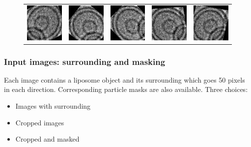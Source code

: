 \documentclass{beamer}
\begin{document}
\begin{frame}
\begin{figure}
\begin{tabular}{ccccc}
\includegraphics[scale=0.5]{augmented/_0_7140.jpeg} & \includegraphics[scale=0.5]{augmented/_0_7746.jpeg} & \includegraphics[scale=0.5]{augmented/_0_8553.jpeg} & \includegraphics[scale=0.5]{augmented/_0_8763.jpeg} & \includegraphics[scale=0.5]{augmented/_0_9361.jpeg} 
	
\end{tabular}
\end{figure}
\end{frame}

%
%

\begin{frame}
\frametitle{Input images: surrounding and masking}
Each image contains a liposome object and its surrounding which goes 50 pixels in each direction. Corresponding particle masks are also available. 
\vskip 0.2in
Three choices:
\begin{itemize}
\item Images with surrounding
\item Cropped images
\item \alert<2>{Cropped and masked} 
\end{itemize}
\end{frame}
\end{document}
